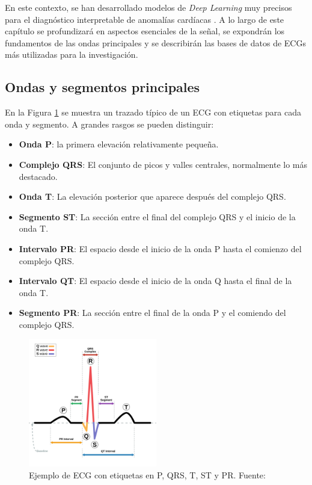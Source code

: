 En este contexto, se han desarrollado modelos de \emph{Deep Learning} muy precisos para el diagnóstico interpretable de anomalías cardíacas \citep{lu2024decoding}. A lo largo de este capítulo se profundizará en aspectos esenciales de la señal, se expondrán los fundamentos de las ondas principales y se describirán las bases de datos de ECGs más utilizadas para la investigación.

\subsection{Ondas y segmentos principales}

En la Figura \ref{fig:latido} se muestra un trazado típico de un ECG con etiquetas para cada onda y segmento. A grandes rasgos se pueden distinguir:
\begin{itemize}
	\item \textbf{Onda P}: la primera elevación relativamente pequeña.
	\item  \textbf{Complejo QRS}: El conjunto de picos y valles centrales, normalmente lo más destacado.
	\item \textbf{Onda T}: La elevación posterior que aparece después del complejo QRS.
	\item \textbf{Segmento ST}: La sección entre el final del complejo QRS y el inicio de la onda T.
	\item \textbf{Intervalo PR}: El espacio desde el inicio de la onda P hasta el comienzo del complejo QRS.
	\item \textbf{Intervalo QT}: El espacio desde el inicio de la onda Q hasta el final de la onda T.
	\item \textbf{Segmento PR}: La sección entre el final de la onda P y el comiendo del complejo QRS.
\end{itemize}

\begin{figure}
	\centering
	\includegraphics[width=0.5\textwidth]{Imagenes/Vectorial/latido.png}
	\caption{Ejemplo de ECG con etiquetas en P, QRS, T, ST y PR. Fuente: \cite{latido_img}}
	\label{fig:latido}
\end{figure}

